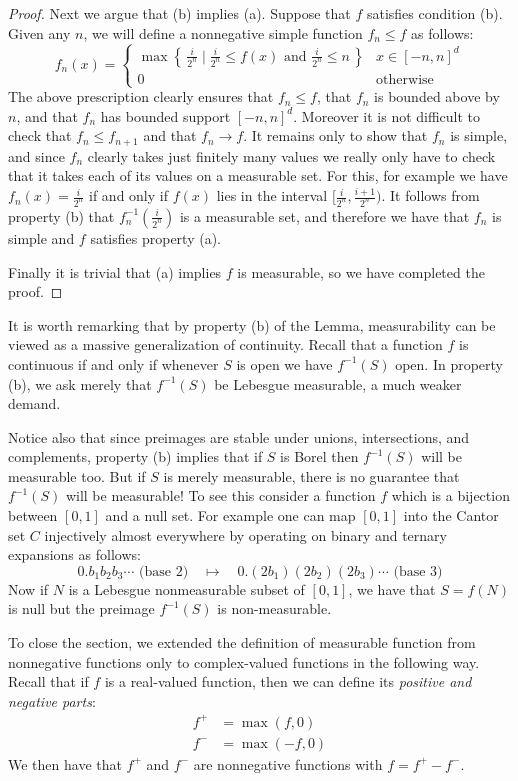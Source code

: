 \documentclass[11pt,oneside]{amsbook}
\newcommand{\set}[1]{\left\{\,#1\,\right\}}
\theoremstyle{definition}
\theoremstyle{plain}
\theoremstyle{definition}
\theoremstyle{remark}
\numberwithin{equation}{section}
\numberwithin{figure}{section}
\begin{document}
\begin{proof}
  Next we argue that (b) implies (a). Suppose that $f$ satisfies condition (b). Given any $n$, we will define a nonnegative simple function $f_n\leq f$ as follows:
  \[f_n(x)=
    \begin{cases}
      \max\set{\frac{i}{2^n}\mid \frac{i}{2^n}\leq f(x)\text{ and } \frac{i}{2^n}\leq n}&x\in[-n,n]^d\\
      0&\text{otherwise}
    \end{cases}
  \]
  The above prescription clearly ensures that $f_n\leq f$, that $f_n$ is bounded above by $n$, and that $f_n$ has bounded support $[-n,n]^d$. Moreover it is not difficult to check that $f_n\leq f_{n+1}$ and that $f_n\to f$. It remains only to show that $f_n$ is simple, and since $f_n$ clearly takes just finitely many values we really only have to check that it takes each of its values on a measurable set. For this, for example we have $f_n(x)=\frac{i}{2^n}$ if and only if $f(x)$ lies in the interval $[\frac{i}{2^n},\frac{i+1}{2^n})$. It follows from property (b) that $f_n^{-1}(\frac{i}{2^n})$ is a measurable set, and therefore we have that $f_n$ is simple and $f$ satisfies property (a).

  Finally it is trivial that (a) implies $f$ is measurable, so we have completed the proof.
\end{proof}

It is worth remarking that by property (b) of the Lemma, measurability can be viewed as a massive generalization of continuity. Recall that a function $f$ is continuous if and only if whenever $S$ is open we have $f^{-1}(S)$ open. In property (b), we ask merely that $f^{-1}(S)$ be Lebesgue measurable, a much weaker demand.

Notice also that since preimages are stable under unions, intersections, and complements, property (b) implies that if $S$ is Borel then $f^{-1}(S)$ will be measurable too. But if $S$ is merely measurable, there is no guarantee that $f^{-1}(S)$ will be measurable! To see this consider a function $f$ which is a bijection between $[0,1]$ and a null set. For example one can map $[0,1]$ into the Cantor set $C$ injectively almost everywhere by operating on binary and ternary expansions as follows:
\[0.b_1b_2b_3\cdots\text{ (base 2)}\quad\mapsto\quad 0.(2b_1)(2b_2)(2b_3)\cdots\text{ (base 3)}
\]
Now if $N$ is a Lebesgue nonmeasurable subset of $[0,1]$, we have that $S=f(N)$ is null but the preimage $f^{-1}(S)$ is non-measurable.

To close the section, we extended the definition of measurable function from nonnegative functions only to complex-valued functions in the following way. Recall that if $f$ is a real-valued function, then we can define its \emph{positive and negative parts}:
\begin{align*}
  f^+&=\max(f,0)\\
  f^-&=\max(-f,0)
\end{align*}
We then have that $f^+$ and $f^-$ are nonnegative functions with $f=f^+-f^-$.
\end{document}
